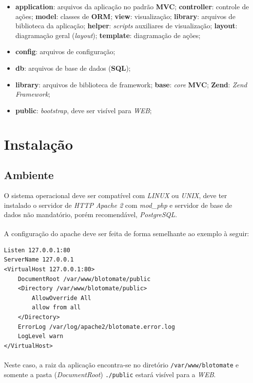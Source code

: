 \documentclass[a4paper,12pt]{article}
\begin{document}
\begin{itemize}
\item \textbf{application}: arquivos da aplicação no padrão \textbf{MVC};
\subitem \textbf{controller}: controle de ações;
\subitem \textbf{model}: classes de \textbf{ORM};
\subitem \textbf{view}: visualização;
\subitem \textbf{library}: arquivos de biblioteca da aplicação;
\subsubitem \textbf{helper}: \emph{scripts} auxiliares de visualização;
\subsubitem \textbf{layout}: diagramação geral (\emph{layout});
\subsubitem \textbf{template}: diagramação de ações;
\item \textbf{config}: arquivos de configuração;
\item \textbf{db}: arquivos de base de dados (\textbf{SQL});
\item \textbf{library}: arquivos de biblioteca de framework;
\subitem \textbf{base}: \emph{core} \textbf{MVC};
\subitem \textbf{Zend}: \emph{Zend Framework};
\item \textbf{public}: \emph{bootstrap}, deve ser visível para \emph{WEB};
\end{itemize}


\section{Instalação}

\subsection{Ambiente}
O sistema operacional deve ser compatível com \emph{LINUX} ou \emph{UNIX}, deve ter instalado o servidor de \emph{HTTP} \emph{Apache 2} com \emph{mod\_php} e servidor de base de dados não mandatório, porém recomendável, \emph{PostgreSQL}.

\paragraph{}
A configuração do apache deve ser feita de forma semelhante ao exemplo à seguir:

\begin{verbatim}
Listen 127.0.0.1:80
ServerName 127.0.0.1
<VirtualHost 127.0.0.1:80>
    DocumentRoot /var/www/blotomate/public
    <Directory /var/www/blotomate/public>
        AllowOverride All
        allow from all
    </Directory>
    ErrorLog /var/log/apache2/blotomate.error.log
    LogLevel warn
</VirtualHost>
\end{verbatim}

\paragraph{}
Neste caso, a raiz da aplicação encontra-se no diretório \texttt{/var/www/blotomate} e somente a pasta (\emph{DocumentRoot}) \texttt{./public} estará visível para a \emph{WEB}.
\end{document}
